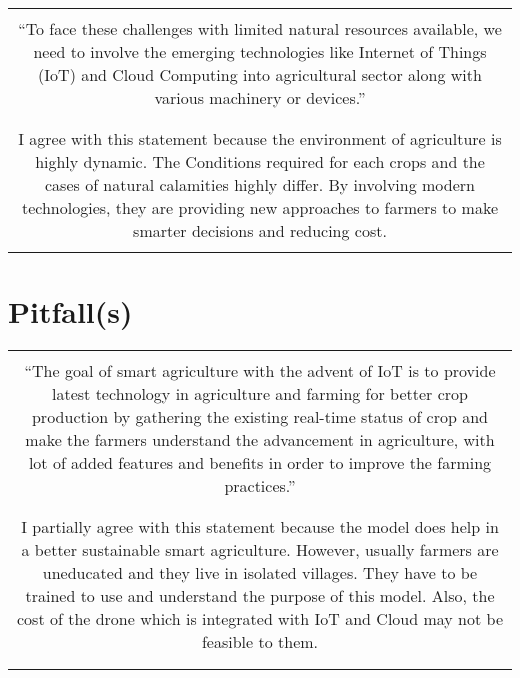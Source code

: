 \documentclass{article}
\begin{document}
\begin{center}
\begin{tabular}{|c|} 
 \hline
 \\
 \multirow{4}{28em}{“To face these challenges with limited natural resources available, we need to involve the
emerging technologies like Internet of Things (IoT) and Cloud Computing into agricultural sector along with various machinery or devices.”} \\
\\
\\
\\
\\
\hline
\\
\multirow{6}{28em}{I agree with this statement because the environment of agriculture is highly dynamic. The Conditions required for each crops and the cases of natural calamities highly differ. By involving modern technologies, they are providing new approaches to farmers to make smarter decisions and reducing cost.} \\
\\
\\
\\
\\
\\
\\
\hline
\end{tabular}
\end{center}
\section{Pitfall(s)}
\begin{center}
\begin{tabular}{|c|} 
 \hline
 \\
 \multirow{6}{28em}{“The goal of smart agriculture with the advent of IoT is to provide latest technology in agriculture and farming for better crop production by gathering the existing real-time status of crop and make the farmers understand the advancement in agriculture, with lot of added features and benefits in order to improve the farming practices.”} \\
 \\
 \\
 \\
 \\
 \\
 \\
 \hline
 \\
 \multirow{5}{28em}{I partially agree with this statement because the model does help in a better sustainable smart agriculture. However, usually farmers are uneducated and they live in isolated villages. They have to be trained to use and understand the purpose of this model. Also, the cost of the drone which is integrated with IoT and Cloud may not be feasible to them.} \\
 \\ 
 \\
 \\
 \\
 \\
 \\
 \hline
\end{tabular}
\end{center}
\end{document}
